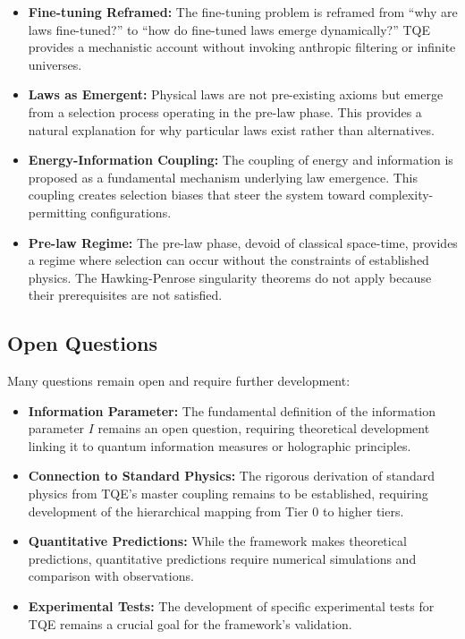 \documentclass[12pt,a4paper]{article}
\theoremstyle{definition}
\theoremstyle{remark}
\begin{document}
\begin{itemize}
\item \textbf{Fine-tuning Reframed:} The fine-tuning problem is reframed from ``why are laws fine-tuned?'' to ``how do fine-tuned laws emerge dynamically?'' TQE provides a mechanistic account without invoking anthropic filtering or infinite universes.

\item \textbf{Laws as Emergent:} Physical laws are not pre-existing axioms but emerge from a selection process operating in the pre-law phase. This provides a natural explanation for why particular laws exist rather than alternatives.

\item \textbf{Energy-Information Coupling:} The coupling of energy and information is proposed as a fundamental mechanism underlying law emergence. This coupling creates selection biases that steer the system toward complexity-permitting configurations.

\item \textbf{Pre-law Regime:} The pre-law phase, devoid of classical space-time, provides a regime where selection can occur without the constraints of established physics. The Hawking-Penrose singularity theorems do not apply because their prerequisites are not satisfied.
\end{itemize}

\subsection{Open Questions}

Many questions remain open and require further development:

\begin{itemize}
\item \textbf{Information Parameter:} The fundamental definition of the information parameter $I$ remains an open question, requiring theoretical development linking it to quantum information measures or holographic principles.

\item \textbf{Connection to Standard Physics:} The rigorous derivation of standard physics from TQE's master coupling remains to be established, requiring development of the hierarchical mapping from Tier 0 to higher tiers.

\item \textbf{Quantitative Predictions:} While the framework makes theoretical predictions, quantitative predictions require numerical simulations and comparison with observations.

\item \textbf{Experimental Tests:} The development of specific experimental tests for TQE remains a crucial goal for the framework's validation.
\end{itemize}
\end{document}
